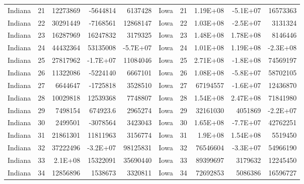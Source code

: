\begin{landscape}
\begin{singlespace}
\begin{longtable}{lrrrr|lrrrr}
		Indiana &  21 & 12273869 & -5644814 & 6137428 & Iowa &  21 & 1.19E+08 & -5.1E+07 & 16573363 \\
		Indiana &  22 & 30291449 & -7168561 & 12868147 & Iowa &  22 & 1.03E+08 & -2.5E+07 & 3131324 \\
		Indiana &  23 & 16287969 & 16247832 & 3179325 & Iowa &  23 & 1.48E+08 & 1.78E+08 & 8146446 \\
		Indiana &  24 & 44432364 & 53135008 & -5.7E+07 & Iowa &  24 & 1.01E+08 & 1.19E+08 & -2.3E+08 \\
		Indiana &  25 & 27817962 & -1.7E+07 & 11084046 & Iowa &  25 & 2.71E+08 & -1.8E+08 & 74569197 \\
		Indiana &  26 & 11322086 & -5224140 & 6667101 & Iowa &  26 & 1.08E+08 & -5.8E+07 & 58702105 \\
		Indiana &  27 & 6644647 & -1725818 & 3528510 & Iowa &  27 & 67194557 & -1.6E+07 & 12436870 \\
		Indiana &  28 & 10029818 & 12539368 & 7748807 & Iowa &  28 & 1.54E+08 & 2.47E+08 & 71841980 \\
		Indiana &  29 & 7498154 & 674923.6 & 2965274 & Iowa &  29 & 32161030 & 4051869 & -2.2E+07 \\
		Indiana &  30 & 2499501 & -3078564 & 3423043 & Iowa &  30 & 1.65E+08 & -7.7E+07 & 42762251 \\
		Indiana &  31 & 21861301 & 11811963 & 3156774 & Iowa &  31 & 1.9E+08 & 1.54E+08 & 5519450 \\
		Indiana &  32 & 37222496 & -3.2E+07 & 98125831 & Iowa &  32 & 76546604 & -3.3E+07 & 54966190 \\
		Indiana &  33 & 2.1E+08 & 15322091 & 35690440 & Iowa &  33 & 89399697 & 3179632 & 12245450 \\
		Indiana &  34 & 12856896 & 1538673 & 3320811 & Iowa &  34 & 72692853 & 5086386 & 16596727\\


\end{longtable}
\end{singlespace}
\end{landscape}
